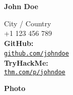 \documentclass[a4paper,10pt]{article}
\newcommand{\customlink}[3]{
    \textbf{#1:\\} \href{#2}{\color{primary} {\texttt{#3}}}
}
\begin{document}
\noindent
\noindent
    \begin{minipage}{0.45\textwidth}
        {\fontsize{10mm}{12mm}\bf John Doe}
    \end{minipage}
    \begin{minipage}{0.30\textwidth}
        \begin{flushleft}
            \fontsize{4mm}{5mm}\selectfont
            {\faMapMarker* \hspace{1mm} City / Country} \\
            {\faPhone \hspace{1mm} +1 123 456 789} \\
            {\faGithub \hspace{1mm} \customlink{GitHub}{https://github.com/johndoe}{github.com/johndoe}}\ \\
            {\faUserShield \hspace{0.1mm} \customlink{TryHackMe}{https://tryhackme.com/p/johndoe}{thm.com/p/johndoe}}
        \end{flushleft}
    \end{minipage}
    \hspace{1mm}
    \begin{minipage}{0.1\textwidth}
        \begin{tcolorbox}[width=35mm,height=35mm, colframe=secondary, colback=white, sharp corners]
            \centering
            \textbf{Photo}
        \end{tcolorbox}
    \end{minipage}
\vspace{5mm}
\end{document}
